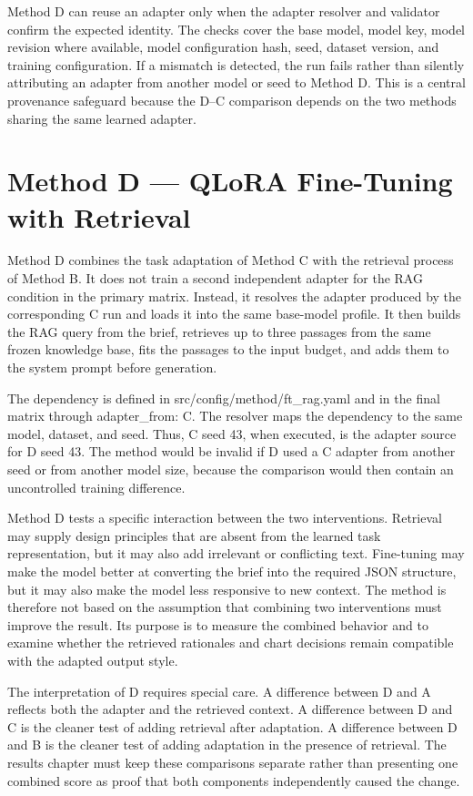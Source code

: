 Method D can reuse an adapter only when the adapter resolver and validator confirm the expected identity. The checks cover the base model, model key, model revision where available, model configuration hash, seed, dataset version, and training configuration. If a mismatch is detected, the run fails rather than silently attributing an adapter from another model or seed to Method D. This is a central provenance safeguard because the D--C comparison depends on the two methods sharing the same learned adapter.

\section{Method D --- QLoRA Fine-Tuning with Retrieval}

Method D combines the task adaptation of Method C with the retrieval process of Method B. It does not train a second independent adapter for the RAG condition in the primary matrix. Instead, it resolves the adapter produced by the corresponding C run and loads it into the same base-model profile. It then builds the RAG query from the brief, retrieves up to three passages from the same frozen knowledge base, fits the passages to the input budget, and adds them to the system prompt before generation.

The dependency is defined in src/config/method/ft\_rag.yaml and in the final matrix through adapter\_from: C. The resolver maps the dependency to the same model, dataset, and seed. Thus, C seed 43, when executed, is the adapter source for D seed 43. The method would be invalid if D used a C adapter from another seed or from another model size, because the comparison would then contain an uncontrolled training difference.

Method D tests a specific interaction between the two interventions. Retrieval may supply design principles that are absent from the learned task representation, but it may also add irrelevant or conflicting text. Fine-tuning may make the model better at converting the brief into the required JSON structure, but it may also make the model less responsive to new context. The method is therefore not based on the assumption that combining two interventions must improve the result. Its purpose is to measure the combined behavior and to examine whether the retrieved rationales and chart decisions remain compatible with the adapted output style.

The interpretation of D requires special care. A difference between D and A reflects both the adapter and the retrieved context. A difference between D and C is the cleaner test of adding retrieval after adaptation. A difference between D and B is the cleaner test of adding adaptation in the presence of retrieval. The results chapter must keep these comparisons separate rather than presenting one combined score as proof that both components independently caused the change.


